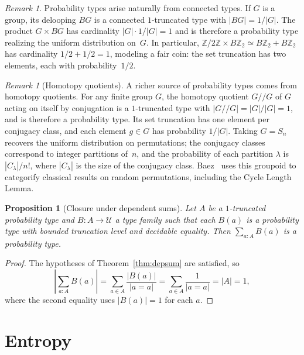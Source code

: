 \documentclass[12pt]{amsart}
\newcommand{\U}{\mathcal{U}}
\newcommand{\BZ}{B\mathbb{Z}}
\theoremstyle{plain}
\newtheorem{proposition}[theorem]{Proposition}
\theoremstyle{definition}
\theoremstyle{remark}
\newtheorem{remark}[theorem]{Remark}
\begin{document}
\begin{remark}\label{rem:prob-construction}
Probability types arise naturally from connected types. If $G$ is a group, its delooping $BG$ is a connected $1$-truncated type with $|BG|=1/|G|$. The product $G\times BG$ has cardinality $|G|\cdot 1/|G|=1$ and is therefore a probability type realizing the uniform distribution on~$G$. In particular, $\mathbb{Z}/2\mathbb{Z}\times\BZ_2\simeq\BZ_2+\BZ_2$ has cardinality $1/2+1/2=1$, modeling a fair coin: the set truncation has two elements, each with probability~$1/2$.
\end{remark}

\begin{remark}[Homotopy quotients]\label{rem:homotopy-quotient}
A richer source of probability types comes from homotopy quotients. For any finite group $G$, the homotopy quotient $G/\!/G$ of $G$ acting on itself by conjugation is a $1$-truncated type with $|G/\!/G|=|G|/|G|=1$, and is therefore a probability type. Its set truncation has one element per conjugacy class, and each element $g\in G$ has probability $1/|G|$. Taking $G=S_n$ recovers the uniform distribution on permutations; the conjugacy classes correspond to integer partitions of~$n$, and the probability of each partition $\lambda$ is $|C_\lambda|/n!$, where $|C_\lambda|$ is the size of the conjugacy class. Baez~\cite{baez2025groupoid} uses this groupoid to categorify classical results on random permutations, including the Cycle Length Lemma.
\end{remark}

\begin{proposition}[Closure under dependent sums]\label{prop:closure}
Let $A$ be a $1$-truncated probability type and $B:A\to\U$ a type family such that each $B(a)$ is a probability type with bounded truncation level and decidable equality. Then $\sum_{a:A}B(a)$ is a probability type.
\end{proposition}

\begin{proof}
The hypotheses of Theorem~\ref{thm:depsum} are satisfied, so
\[
\left|\sum_{a:A}B(a)\right| = \sum_{a\in A}\frac{|B(a)|}{|a=a|} = \sum_{a\in A}\frac{1}{|a=a|} = |A| = 1,
\]
where the second equality uses $|B(a)|=1$ for each $a$.
\end{proof}

\section{Entropy}\label{sec:entropy}
\end{document}
